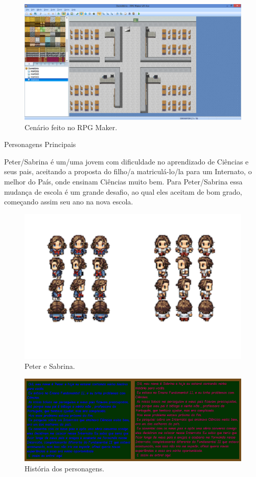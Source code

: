 \documentclass{sciposter}
\begin{document}
\begin{multicols}{2}
\begin{figure}[!htb]
     \centering
     \includegraphics{rpg.png}
     \caption{Cenário feito no RPG Maker.}
\end{figure}
\centerline{Personagens Principais}
Peter/Sabrina é um/uma jovem com dificuldade no aprendizado de Ciências e seus pais, aceitando a proposta do filho/a matriculá-lo/la para um Internato, o melhor do País, onde ensinam Ciências muito bem. Para Peter/Sabrina essa mudança de escola é um grande desafio, ao qual eles aceitam de bom grado, começando assim seu ano na nova escola. 
\begin{figure}[!htb]
     \centering
     \includegraphics{personagens.png}
     \caption{Peter e Sabrina.}
\end{figure}
\begin{figure}[!htb]
     \centering
     \includegraphics{hist.png}
     \caption{História dos personagens.}
\end{figure}
\newline
\newline
\newline

\end{multicols}
\end{document}
